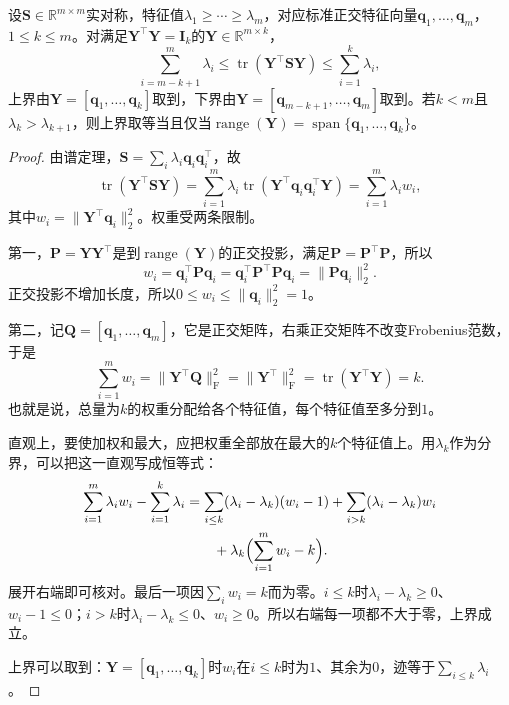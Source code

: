 \begin{theorem}[迹极值]
\label{thm:matrix-analysis-trace-minimum}
设$\bm S\in\mathbb R^{m\times m}$实对称，特征值$\lambda_1\geq\cdots\geq\lambda_m$，对应标准正交特征向量$\bm q_1,\ldots,\bm q_m$，$1\leq k\leq m$。对满足$\bm Y^\top\bm Y=\bm I_k$的$\bm Y\in\mathbb R^{m\times k}$，
\begin{equation}
 \sum_{i=m-k+1}^{m}\lambda_i\leq\operatorname{tr}(\bm Y^\top\bm S\bm Y)\leq\sum_{i=1}^{k}\lambda_i,
 \label{eq:matrix-analysis-trace-minimum}
\end{equation}
上界由$\bm Y=[\bm q_1,\ldots,\bm q_k]$取到，下界由$\bm Y=[\bm q_{m-k+1},\ldots,\bm q_m]$取到。若$k<m$且$\lambda_k>\lambda_{k+1}$，则上界取等当且仅当$\operatorname{range}(\bm Y)=\operatorname{span}\{\bm q_1,\ldots,\bm q_k\}$。
\end{theorem}
\begin{proof}
由谱定理，$\bm S=\sum_i\lambda_i\bm q_i\bm q_i^\top$，故
\[
 \operatorname{tr}(\bm Y^\top\bm S\bm Y)
 =\sum_{i=1}^m\lambda_i\operatorname{tr}(\bm Y^\top\bm q_i\bm q_i^\top\bm Y)
 =\sum_{i=1}^m\lambda_iw_i,
\]
其中$w_i=\lVert\bm Y^\top\bm q_i\rVert_2^2$。权重受两条限制。

第一，$\bm P=\bm Y\bm Y^\top$是到$\operatorname{range}(\bm Y)$的正交投影，满足$\bm P=\bm P^\top\bm P$，所以
\[
 w_i=\bm q_i^\top\bm P\bm q_i=\bm q_i^\top\bm P^\top\bm P\bm q_i=\lVert\bm P\bm q_i\rVert_2^2 .
\]
正交投影不增加长度，所以$0\leq w_i\leq\lVert\bm q_i\rVert_2^2=1$。

第二，记$\bm Q=[\bm q_1,\ldots,\bm q_m]$，它是正交矩阵，右乘正交矩阵不改变Frobenius范数，于是
\[
 \sum_{i=1}^mw_i=\lVert\bm Y^\top\bm Q\rVert_{\mathrm F}^2=\lVert\bm Y^\top\rVert_{\mathrm F}^2=\operatorname{tr}(\bm Y^\top\bm Y)=k .
\]
也就是说，总量为$k$的权重分配给各个特征值，每个特征值至多分到$1$。

直观上，要使加权和最大，应把权重全部放在最大的$k$个特征值上。用$\lambda_k$作为分界，可以把这一直观写成恒等式：
\[
 \begin{aligned}
 \sum_{i=1}^m\lambda_iw_i-\sum_{i=1}^k\lambda_i
 &=\sum_{i\leq k}(\lambda_i-\lambda_k)(w_i-1)+\sum_{i>k}(\lambda_i-\lambda_k)w_i\\
 &\qquad+\lambda_k\Bigl(\sum_{i=1}^mw_i-k\Bigr).
 \end{aligned}
\]
展开右端即可核对。最后一项因$\sum_iw_i=k$而为零。$i\leq k$时$\lambda_i-\lambda_k\geq0$、$w_i-1\leq0$；$i>k$时$\lambda_i-\lambda_k\leq0$、$w_i\geq0$。所以右端每一项都不大于零，上界成立。

上界可以取到：$\bm Y=[\bm q_1,\ldots,\bm q_k]$时$w_i$在$i\leq k$时为$1$、其余为$0$，迹等于$\sum_{i\leq k}\lambda_i$。


\end{proof}
